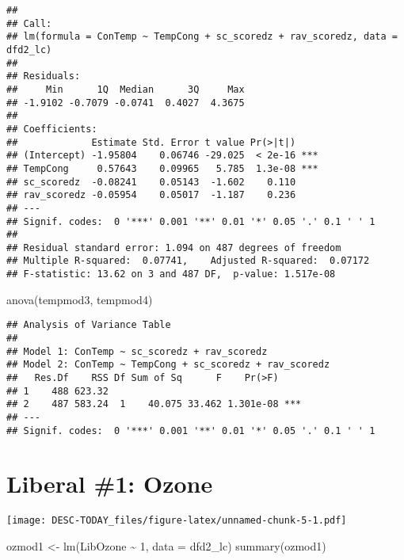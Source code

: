 \documentclass[
]{article}
\newenvironment{Shaded}{\begin{snugshade}}{\end{snugshade}}
\newcommand{\AttributeTok}[1]{\textcolor[rgb]{0.77,0.63,0.00}{#1}}
\newcommand{\DecValTok}[1]{\textcolor[rgb]{0.00,0.00,0.81}{#1}}
\newcommand{\FunctionTok}[1]{\textcolor[rgb]{0.00,0.00,0.00}{#1}}
\newcommand{\NormalTok}[1]{#1}
\newcommand{\OtherTok}[1]{\textcolor[rgb]{0.56,0.35,0.01}{#1}}
\newcommand{\SpecialCharTok}[1]{\textcolor[rgb]{0.00,0.00,0.00}{#1}}
\begin{document}
\begin{verbatim}
## 
## Call:
## lm(formula = ConTemp ~ TempCong + sc_scoredz + rav_scoredz, data = dfd2_lc)
## 
## Residuals:
##     Min      1Q  Median      3Q     Max 
## -1.9102 -0.7079 -0.0741  0.4027  4.3675 
## 
## Coefficients:
##             Estimate Std. Error t value Pr(>|t|)    
## (Intercept) -1.95804    0.06746 -29.025  < 2e-16 ***
## TempCong     0.57643    0.09965   5.785  1.3e-08 ***
## sc_scoredz  -0.08241    0.05143  -1.602    0.110    
## rav_scoredz -0.05954    0.05017  -1.187    0.236    
## ---
## Signif. codes:  0 '***' 0.001 '**' 0.01 '*' 0.05 '.' 0.1 ' ' 1
## 
## Residual standard error: 1.094 on 487 degrees of freedom
## Multiple R-squared:  0.07741,    Adjusted R-squared:  0.07172 
## F-statistic: 13.62 on 3 and 487 DF,  p-value: 1.517e-08
\end{verbatim}

\begin{Shaded}
\begin{Highlighting}[]
\FunctionTok{anova}\NormalTok{(tempmod3, tempmod4)}
\end{Highlighting}
\end{Shaded}

\begin{verbatim}
## Analysis of Variance Table
## 
## Model 1: ConTemp ~ sc_scoredz + rav_scoredz
## Model 2: ConTemp ~ TempCong + sc_scoredz + rav_scoredz
##   Res.Df    RSS Df Sum of Sq      F    Pr(>F)    
## 1    488 623.32                                  
## 2    487 583.24  1    40.075 33.462 1.301e-08 ***
## ---
## Signif. codes:  0 '***' 0.001 '**' 0.01 '*' 0.05 '.' 0.1 ' ' 1
\end{verbatim}

\hypertarget{liberal-1-ozone}{%
\section{Liberal \#1: Ozone}\label{liberal-1-ozone}}

\texttt{[image: DESC-TODAY\_files/figure-latex/unnamed-chunk-5-1.pdf]}

\begin{Shaded}
\begin{Highlighting}[]
\NormalTok{ozmod1 }\OtherTok{\textless{}{-}} \FunctionTok{lm}\NormalTok{(LibOzone }\SpecialCharTok{\textasciitilde{}} \DecValTok{1}\NormalTok{, }\AttributeTok{data =}\NormalTok{ dfd2\_lc)}
\FunctionTok{summary}\NormalTok{(ozmod1)}
\end{Highlighting}
\end{Shaded}
\end{document}
